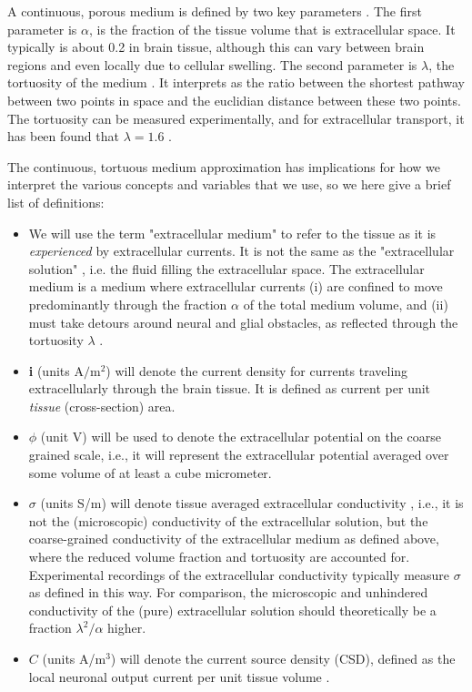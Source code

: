 A continuous, porous medium is defined by two key parameters \citep{Nicholson1981}. The first parameter is $\alpha$, is the fraction of the tissue volume that is extracellular space. It typically is about 0.2 in brain tissue, although this can vary between brain regions and even locally due to cellular swelling. The second parameter is $\lambda$, the tortuosity of the medium \citep{Nicholson1981}. It interprets as the ratio between the shortest pathway between two points in space and the euclidian distance between these two points. The tortuosity can be measured experimentally, and for extracellular transport, it has been found that $\lambda = 1.6$ \citep{Nicholson1998}. 

The continuous, tortuous medium approximation has implications for how we interpret the various concepts and variables that we use, so we here give a brief list of definitions: 

\begin{itemize}
\item We will use the term "extracellular medium" to refer to the tissue as it is \textit{experienced} by extracellular currents. It is not the same as the "extracellular solution" , i.e. the fluid filling the extracellular space. The extracellular medium is a medium where extracellular currents (i) are confined to move predominantly through the fraction $\alpha$ of the total medium volume, and (ii) must take detours around neural and glial obstacles, as reflected through the tortuosity $\lambda$ \citep{Nicholson1998, Nunez2006}. 

\item  {\bf i} (units $\mathrm{A/m^2}$) will denote the current density for currents traveling extracellularly through the brain tissue. It is defined as current per unit \textit{tissue} (cross-section) area.

\item $\phi$ (unit V) will be used to denote the extracellular potential on the coarse grained scale, i.e., it will represent the extracellular potential averaged over some volume of at least a cube micrometer.

\item $\sigma$ (units S/m) will denote tissue averaged extracellular conductivity , i.e., it is not the (microscopic) conductivity of the extracellular solution, but the coarse-grained conductivity of the extracellular medium as defined above, where the reduced volume fraction and tortuosity are accounted for. Experimental recordings of the extracellular conductivity typically measure 
$\sigma$ as defined in this way. For comparison, the microscopic and unhindered conductivity of the (pure) extracellular solution should theoretically be a fraction $\lambda^2/\alpha$ higher. 

\item $C$ (units A/m$^3$) will denote the current source density (CSD), defined as the local neuronal output current per unit tissue volume .

\end{itemize}

